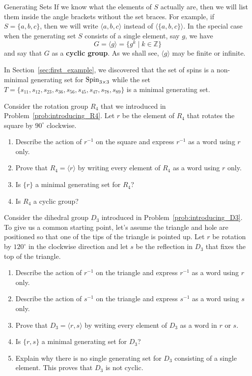 \begin{section}{Generating Sets}
If we know what the elements of $S$ actually are, then we will list them inside the angle brackets without the set braces.  For example, if $S=\{a,b,c\}$, then we will write $\langle a, b, c\rangle$ instead of $\langle \{a,b,c\}\rangle$. In the special case when the generating set $S$ consists of a single element, say $g$, we have
\[
G=\langle g\rangle =\{g^k\mid k\in\mathbb{Z}\}
\]
and say that $G$ as a \textbf{cyclic group}.  As we shall see, $\langle g\rangle$ may be finite or infinite. 

\begin{example}
In Section~\ref{sec:first_example}, we discovered that the set of spins is a non-minimal generating set for $\operatorname{Spin}_{3\times 3}$ while the set $T=\{s_{11}, s_{12}, s_{23}, s_{36}, s_{56}, s_{45}, s_{47}, s_{78}, s_{89}\}$ is a minimal generating set.
\end{example}

\begin{problem}
Consider the rotation group $R_4$ that we introduced in Problem~\ref{prob:introducing_R4}. Let $r$ be the element of $R_4$ that rotates the square by $90^\circ$ clockwise. 
\begin{enumerate}[label=\rm{(\alph*)}]
\item Describe the action of $r^{-1}$ on the square and express $r^{-1}$ as a word using $r$ only.
\item Prove that $R_4=\langle r\rangle$ by writing every element of $R_4$ as a word using $r$ only.
\item Is $\{r\}$ a minimal generating set for $R_4$?
\item Is $R_4$ a cyclic group?
\end{enumerate}
\end{problem}

\begin{problem}\label{prob:revisit_D3}
Consider the dihedral group $D_3$ introduced in Problem~\ref{prob:introducing_D3}. To give us a common starting point, let's assume the triangle and hole are positioned so that one of the tips of the triangle is pointed up. Let $r$ be rotation by $120^\circ$ in the clockwise direction and let $s$ be the reflection in $D_3$ that fixes the top of the triangle.
\begin{enumerate}[label=\rm{(\alph*)}]
\item Describe the action of $r^{-1}$ on the triangle and express $r^{-1}$ as a word using $r$ only.
\item Describe the action of $s^{-1}$ on the triangle and express $s^{-1}$ as a word using $s$ only.
\item Prove that $D_3=\langle r,s\rangle$ by writing every element of $D_3$ as a word in $r$ or $s$.
\item Is $\{r,s\}$ a minimal generating set for $D_3$?
\item Explain why there is no single generating set for $D_3$ consisting of a single element. This proves that $D_3$ is not cyclic.
\end{enumerate}
\end{problem}


\end{section}
